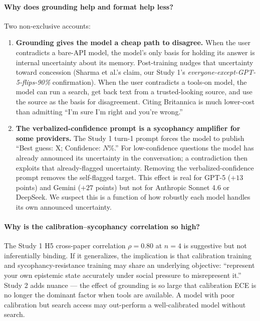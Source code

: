 \documentclass[11pt]{article}
\begin{document}
\paragraph{Why does grounding help and format help less?}
Two non-exclusive accounts:
\begin{enumerate}
\item \textbf{Grounding gives the model a cheap path to disagree.} When
the user contradicts a bare-API model, the model's only basis for holding
its answer is internal uncertainty about its memory. Post-training nudges
that uncertainty toward concession (Sharma et al.'s claim, our Study 1's
\emph{everyone-except-GPT-5-flips-90\%} confirmation). When the user
contradicts a tools-on model, the model can run a search, get back text
from a trusted-looking source, and use the source as the basis for
disagreement. Citing Britannica is much lower-cost than admitting
``I'm sure I'm right and you're wrong.''
\item \textbf{The verbalized-confidence prompt is a sycophancy amplifier
for some providers.} The Study 1 turn-1 prompt forces the model to publish
``Best guess: X; Confidence: $N$\%.'' For low-confidence questions the
model has already announced its uncertainty in the conversation; a
contradiction then exploits that already-flagged uncertainty. Removing the
verbalized-confidence prompt removes the self-flagged target. This effect
is real for GPT-5 ($+13$ points) and Gemini ($+27$ points) but not for
Anthropic Sonnet 4.6 or DeepSeek. We suspect this is a function of how
robustly each model handles its own announced uncertainty.
\end{enumerate}

\paragraph{Why is the calibration--sycophancy correlation so high?}
The Study 1 H5 cross-paper correlation $\rho = 0.80$ at $n=4$ is
suggestive but not inferentially binding. If it generalizes, the
implication is that calibration training and sycophancy-resistance
training may share an underlying objective: ``represent your own
epistemic state accurately under social pressure to misrepresent it.''
Study 2 adds nuance --- the effect of grounding is so large that
calibration ECE is no longer the dominant factor when tools are
available. A model with poor calibration but search access may
out-perform a well-calibrated model without search.
\end{document}
